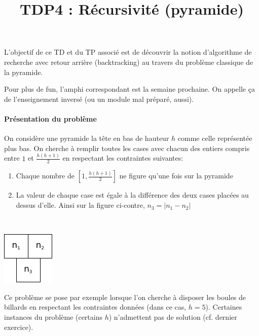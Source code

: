 \documentclass[10pt]{article}\usepackage[correction,nu]{esial}
\begin{document}
\color{black}
\title{TDP4 : Récursivité (pyramide)}
\maketitle

L'objectif de ce TD et du TP associé est de découvrir la notion d'algorithme de
recherche avec retour arrière (backtracking) au travers du problème classique de
la pyramide.

\begin{Reponse}
  Pour plus de fun, l'amphi correspondant est la semaine prochaine. On appelle
  ça de l'enseignement inversé (ou un module mal préparé, aussi).
\end{Reponse}


\paragraph{Présentation du problème}

On considère une pyramide la tête en bas de hauteur $h$ comme celle
représentée plus bas. On cherche à remplir toutes les cases avec chacun des
entiers compris entre $1$ et $\frac{h(h+1)}{2}$ en respectant les contraintes
suivantes:

\begin{minipage}{.8\linewidth}
\begin{enumerate}
\item Chaque nombre de $\left[1,\frac{h(h+1)}{2}\right]$ ne figure qu'une fois sur la pyramide
\item La valeur de chaque case est égale à la différence des deux cases placées
  au dessus d'elle.
  Ainsi sur la figure ci-contre, $n_3=|n_1 - n_2|$
\end{enumerate}  
\end{minipage}~\begin{minipage}{.2\linewidth}
  \centering
  \includegraphics{img/pyramide3.pdf} 
\end{minipage}


\noindent Ce problème se pose par exemple lorsque l'on cherche à disposer les
boules de billards en respectant les contraintes données (dans ce cas,
$h=5$). Certaines instances du problème (certains $h$) n'admettent pas de
solution (cf. dernier exercice).
\end{document}
